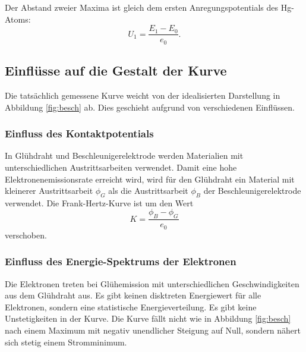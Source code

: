 \noindent Der Abstand zweier Maxima ist gleich dem ersten Anregungspotentials des Hg-Atoms:
\begin{equation}
  \label{eq:pot}
  U_1 = \frac{E_1 - E_0}{e_0}  .
\end{equation}
 \subsection{Einflüsse auf die Gestalt der Kurve}
Die tatsächlich gemessene Kurve weicht von der idealisierten Darstellung in Abbildung \ref{fig:besch} ab.
Dies geschieht aufgrund von verschiedenen Einflüssen.
\subsubsection{Einfluss des Kontaktpotentials}
In Glühdraht und Beschleunigerelektrode werden Materialien mit unterschiedlichen Austrittsarbeiten verwendet.
Damit eine hohe Elektronenemissionsrate erreicht wird, wird für den Glühdraht ein Material mit kleinerer Austrittsarbeit $\phi_G$ als die Austrittsarbeit $\phi_B$ der Beschleunigerelektrode verwendet.
Die Frank-Hertz-Kurve ist um den Wert
\begin{equation}
  \label{eq:k}
  K = \frac{\phi_B - \phi_G}{e_0}
\end{equation}
verschoben.
\subsubsection{Einfluss des Energie-Spektrums der Elektronen}
Die Elektronen treten bei Glühemission mit unterschiedlichen Geschwindigkeiten aus dem Glühdraht aus.
Es gibt keinen disktreten Energiewert für alle Elektronen, sondern eine statistische Energieverteilung.
Es gibt keine Unstetigkeiten in der Kurve.
Die Kurve fällt nicht wie in Abbildung \ref{fig:besch} nach einem Maximum mit negativ unendlicher Steigung auf Null, sondern nähert sich stetig einem Stromminimum.
